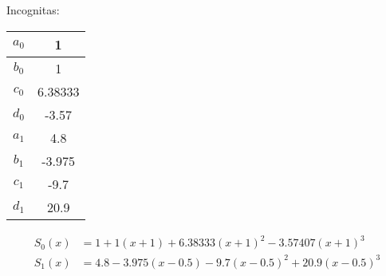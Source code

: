 \documentclass[12pt]{article}
\begin{document}
\begin{enumerate}
                Incognitas:
        \begin{table}
        \centering
        \begin{tabular}{|c|c|}
        \hline
        $a_0$& 1    \\\hline 
        $b_0$& 1     \\\hline
        $c_0$& 6.38333        \\ \hline
        $d_0$& -3.57     \\ \hline
        $a_1$& 4.8        \\ \hline
        $b_1$& -3.975 \\ \hline     
        $c_1$& -9.7 \\ \hline
        $d_1$& 20.9 \\ \hline
        \end{tabular}
        \end{table}


        \[
        \begin{aligned}
        S_0(x) &= 1 + 1(x + 1) + 6.38333(x + 1)^2 - 3.57407(x + 1)^3 \\
        S_1(x) &= 4.8 - 3.975(x - 0.5) - 9.7(x - 0.5)^2 + 20.9(x - 0.5)^3
        \end{aligned}
        \]
\end{enumerate}




%
%
\end{document}
